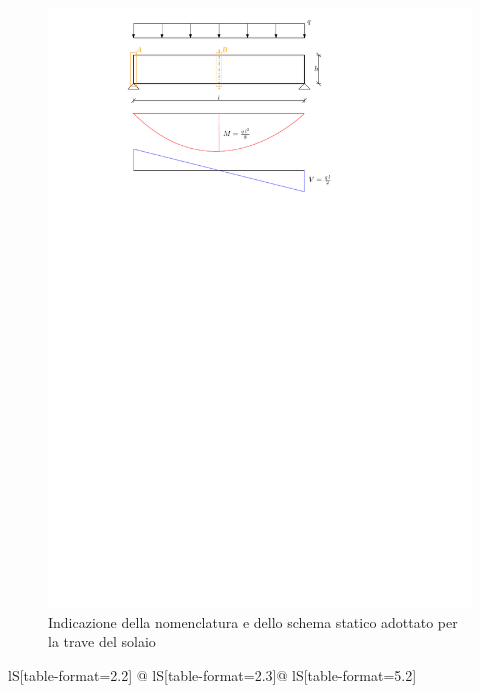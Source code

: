 \begin{pysub}[TraveSolaio]
\begin{figure}[H]
    \centering
    \includegraphics[]{IMG/TraveRettangolare.pdf}
    \caption{Indicazione della nomenclatura e dello schema statico adottato per la trave del solaio}
    \label{fig:TraveSolaio}
\end{figure}
\begin{table}[H]
    \centering
    \caption{Valori di progetto per la verifica della trave del solaio}
    \begin{tabular}{lS[table-format=2.2] @{\hspace{2cm}} lS[table-format=2.3]@{\hspace{2cm}} lS[table-format=5.2]}
        \toprule
		\\
        \midrule

\end{tabular}
\end{table}
\end{pysub}
